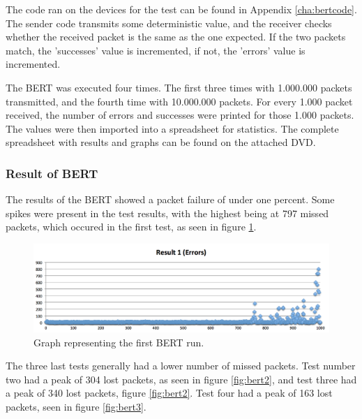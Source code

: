 The code ran on the devices for the test can be found in Appendix \ref{cha:bertcode}. The sender code transmits some deterministic value, and the receiver checks whether the received packet is the same as the one expected. If the two packets match, the 'successes' value is incremented, if not, the 'errors' value is incremented.

The BERT was executed four times. The first three times with 1.000.000 packets transmitted, and the fourth time with 10.000.000 packets. For every 1.000 packet received, the number of errors and successes were printed for those 1.000 packets. 
The values were then imported into a spreadsheet for statistics.
The complete spreadsheet with results and graphs can be found on the attached DVD. 

\subsubsection*{Result of BERT}
The results of the BERT showed a packet failure of under one percent. Some spikes were present in the test results, with the highest being at 797 missed packets, which occured in the first test, as seen in figure \ref{fig:bert1}.

\begin{figure}[h!]
\hspace*{-2cm}
\includegraphics[width=1.3\textwidth]{chapters/test/figures/res1.png}
\caption{Graph representing the first BERT run.}
\label{fig:bert1}
\end{figure}

The three last tests generally had a lower number of missed packets. Test number two had a peak of 304 lost packets, as seen in figure \ref{fig:bert2}, and test three had a peak of 340 lost packets, figure \ref{fig:bert2}. Test four had a peak of 163 lost packets, seen in figure \ref{fig:bert3}.

